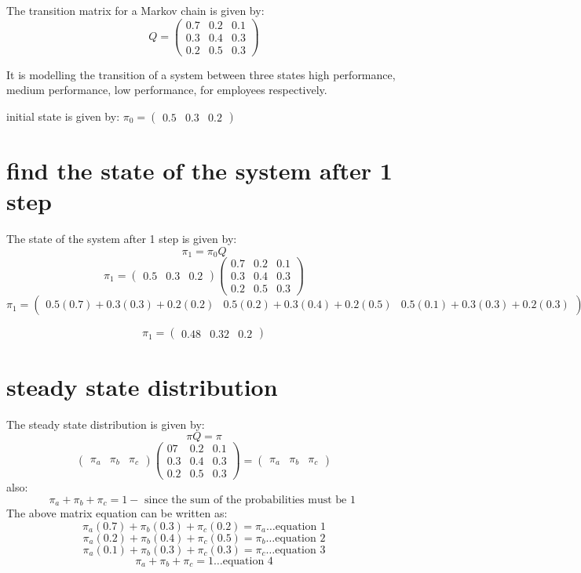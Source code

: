 \documentclass{article}
\begin{document}
The transition matrix for a Markov chain is given by:
\[Q=\begin{pmatrix}
0.7 & 0.2 & 0.1 \\
0.3 & 0.4 & 0.3 \\
0.2 & 0.5 & 0.3
\end{pmatrix}\]

It is modelling the transition of a system between three states high performance, medium performance, low performance, for employees respectively.


initial state is given by: \(\pi_0 = \begin{pmatrix} 0.5 & 0.3 & 0.2 \end{pmatrix}\)

\section{find the state of the system after 1 step}
The state of the system after 1 step is given by:
\[\pi_1 = \pi_0Q\]
\[\pi_1 = \begin{pmatrix} 0.5 & 0.3 & 0.2 \end{pmatrix}\begin{pmatrix}0.7 & 0.2 & 0.1 \\ 0.3 & 0.4 & 0.3 \\ 0.2 & 0.5 & 0.3\end{pmatrix}\]
\[\pi_1 = \begin{pmatrix}
0.5(0.7) + 0.3(0.3) + 0.2(0.2) & 0.5(0.2) + 0.3(0.4) + 0.2(0.5) & 0.5(0.1) + 0.3(0.3) + 0.2(0.3)
\end{pmatrix}\]

\[\pi_1 = \begin{pmatrix}0.48 & 0.32 & 0.2\end{pmatrix}\]

\section{steady state distribution}
The steady state distribution is given by:
\[\pi Q= \pi\]
\[\begin{pmatrix}
\pi_a & \pi_b & \pi_c
\end{pmatrix}\begin{pmatrix}07 & 0.2 & 0.1 \\ 0.3 & 0.4 & 0.3 \\ 0.2 & 0.5 & 0.3\end{pmatrix} = \begin{pmatrix} \pi_a & \pi_b & \pi_c \end{pmatrix}\]
also:
\[\pi_a + \pi_b + \pi_c = 1 -\text{ since the sum of the probabilities must be 1 }\]
The  above matrix equation can be written as:
\[\pi_a(0.7) + \pi_b(0.3) + \pi_c(0.2) = \pi_a \ldots \text{equation 1}\]
\[\pi_a(0.2) + \pi_b(0.4) + \pi_c(0.5) = \pi_b \ldots\text{equation 2}\]
\[\pi_a(0.1) + \pi_b(0.3) + \pi_c(0.3) = \pi_c \ldots\text{equation 3}\]
\[\pi_a + \pi_b + \pi_c = 1 \ldots\text{equation 4}\]
\end{document}
